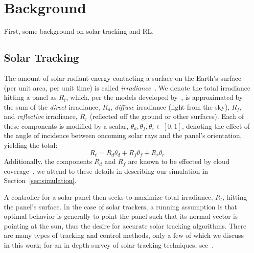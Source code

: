\documentclass{article}
\begin{document}
\section{Background}


First, some background on solar tracking and RL.

\subsection{Solar Tracking}
The amount of solar radiant energy contacting a surface on the Earth's surface (per unit area, per unit time) is called {\it irradiance}~\cite{goswami2000principles}.  We denote the total irradiance hitting a panel as $R_t$, which, per the models developed by~\citet{kamali2006estimating}, is approximated by the sum of the {\it direct} irradiance, $R_d$, {\it diffuse} irradiance (light from the sky), $R_f$, and {\it reflective} irradiance, $R_r$ (reflected off the ground or other surfaces). Each of these components is modified by a scalar, $\theta_d, \theta_f, \theta_r \in [0,1]$, denoting the effect of the angle of incidence between oncoming solar rays and the panel's orientation, yielding the total:
\begin{equation}
R_t = R_d \theta_d + R_f \theta_f + R_r \theta_r
\label{eq:total_rads}
\end{equation}
Additionally, the components $R_d$ and $R_f$ are known to be effected by cloud coverage~\cite{li2004overcast,pfister2003cloud,tzoumanikas2016effect}.  we attend to these details in describing our simulation in Section~\ref{sec:simulation}.

A controller for a solar panel then seeks to maximize total irradiance, $R_t$, hitting the panel's surface. In the case of solar trackers, a running assumption is that optimal behavior is generally to point the panel such that its normal vector is pointing at the sun, thus the desire for accurate solar tracking algorithms. There are many types of tracking and control methods, only a few of which we discuss in this work; for an in depth survey of solar tracking techniques, see~\citet{mousazadeh2009review}.
\end{document}
